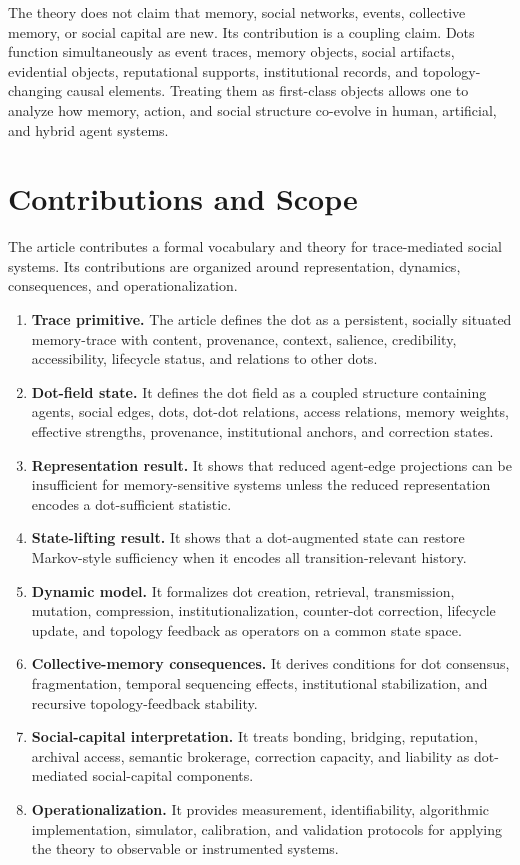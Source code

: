 \documentclass[11pt]{article}
\theoremstyle{remark}
\begin{document}
The theory does not claim that memory, social networks, events, collective memory, or social capital are new. Its contribution is a coupling claim. Dots function simultaneously as event traces, memory objects, social artifacts, evidential objects, reputational supports, institutional records, and topology-changing causal elements. Treating them as first-class objects allows one to analyze how memory, action, and social structure co-evolve in human, artificial, and hybrid agent systems.

\section{Contributions and Scope}\label{contributions-scope}

The article contributes a formal vocabulary and theory for trace-mediated social systems. Its contributions are organized around representation, dynamics, consequences, and operationalization.

\begin{enumerate}[leftmargin=*,label=\textbf{C\arabic*.}]
\item \textbf{Trace primitive.} The article defines the dot as a persistent, socially situated memory-trace with content, provenance, context, salience, credibility, accessibility, lifecycle status, and relations to other dots.
\item \textbf{Dot-field state.} It defines the dot field as a coupled structure containing agents, social edges, dots, dot-dot relations, access relations, memory weights, effective strengths, provenance, institutional anchors, and correction states.
\item \textbf{Representation result.} It shows that reduced agent-edge projections can be insufficient for memory-sensitive systems unless the reduced representation encodes a dot-sufficient statistic.
\item \textbf{State-lifting result.} It shows that a dot-augmented state can restore Markov-style sufficiency when it encodes all transition-relevant history.
\item \textbf{Dynamic model.} It formalizes dot creation, retrieval, transmission, mutation, compression, institutionalization, counter-dot correction, lifecycle update, and topology feedback as operators on a common state space.
\item \textbf{Collective-memory consequences.} It derives conditions for dot consensus, fragmentation, temporal sequencing effects, institutional stabilization, and recursive topology-feedback stability.
\item \textbf{Social-capital interpretation.} It treats bonding, bridging, reputation, archival access, semantic brokerage, correction capacity, and liability as dot-mediated social-capital components.
\item \textbf{Operationalization.} It provides measurement, identifiability, algorithmic implementation, simulator, calibration, and validation protocols for applying the theory to observable or instrumented systems.
\end{enumerate}
\end{document}
